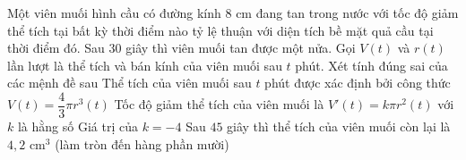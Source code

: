 \begin{ex}%
Một viên muối hình cầu có đường kính $8$ cm đang tan trong nước với tốc độ giảm thể tích tại bất kỳ thời điểm nào tỷ lệ thuận với diện tích bề mặt quả cầu tại thời điểm đó. Sau $30$ giây thì viên muối tan được một nửa. Gọi $V(t)$ và $r(t)$ lần lượt là thể tích và bán kính của viên muối sau $t$ phút. Xét tính đúng sai của các mệnh đề sau
\choiceTF
{\True Thể tích của viên muối sau $t$ phút được xác định bởi công thức $V(t)=\dfrac{4}{3}\pi r^3(t)$}
{\True Tốc độ giảm thể tích của viên muối là $V'(t)=k\pi r^2(t)$ với $k$ là hằng số}
{Giá trị của $k=-4$}
{Sau $45$ giây thì thể tích của viên muối còn lại là $4{,}2$ cm$^3$ (làm tròn đến hàng phần mười)}
\end{ex}

